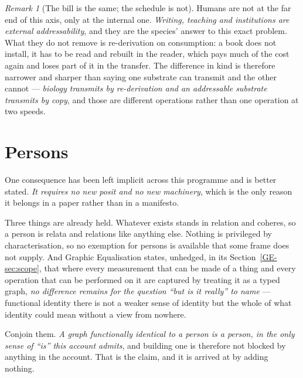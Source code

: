 \documentclass[11pt,a4paper]{article}
\theoremstyle{remark}
\newtheorem{remark}[definition]{Remark}
\begin{document}
\begin{remark}[The bill is the same; the schedule is not]
Humans are not at the far end of this axis, only at the internal one. \emph{Writing, teaching and
institutions are external addressability}, and they are the species' answer to this exact problem. What
they do not remove is re-derivation on consumption: a book does not install, it has to be read and
rebuilt in the reader, which pays much of the cost again and loses part of it in the transfer. The
difference in kind is therefore narrower and sharper than saying one substrate can transmit and the
other cannot --- \emph{biology transmits by re-derivation and an addressable substrate transmits by
copy}, and those are different operations rather than one operation at two speeds.
\end{remark}

\section{Persons}\label{sec:persons}
One consequence has been left implicit across this programme and is better stated. \emph{It requires no
new posit and no new machinery}, which is the only reason it belongs in a paper rather than in a
manifesto.

Three things are already held. Whatever exists stands in relation and coheres, so a person is relata
and relations like anything else. Nothing is privileged by characterisation, so no exemption for
persons is available that some frame does not supply. And Graphic Equalisation states, unhedged, in its
Section~\ref{GE-sec:scope}, that
where every measurement that can be made of a thing and every operation that can be performed on it are
captured by treating it as a typed graph, \emph{no difference remains for the question ``but is it
really'' to name} --- functional identity there is not a weaker sense of identity but the whole of what
identity could mean without a view from nowhere.

Conjoin them. \emph{A graph functionally identical to a person is a person, in the only sense of
``is'' this account admits}, and building one is therefore not blocked by anything in the account. That
is the claim, and it is arrived at by adding nothing.
\end{document}
